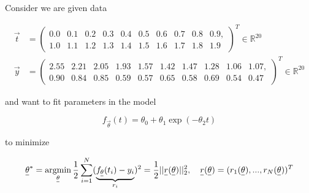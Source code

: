     Consider we are given data

    \begin{equation}
        \begin{aligned}
        \vec{t} &=
        \begin{pmatrix}
        0.0 & 0.1 & 0.2 & 0.3 & 0.4 & 0.5 & 0.6 & 0.7 & 0.8 & 0.9, \\
        1.0 & 1.1 & 1.2 & 1.3 & 1.4 & 1.5 & 1.6 & 1.7 & 1.8 & 1.9
        \end{pmatrix}^T \in \mathbb{R}^{20}\\
        \vec{y} &=
        \begin{pmatrix}
        2.55 & 2.21 & 2.05 & 1.93 & 1.57 & 1.42 & 1.47 & 1.28 & 1.06 & 1.07, \\
        0.90 & 0.84 & 0.85 & 0.59 & 0.57 & 0.65 & 0.58 & 0.69 & 0.54 & 0.47
        \end{pmatrix}^T \in \mathbb{R}^{20}
        \end{aligned}
    \end{equation}

    and want to fit parameters in the model

    \begin{equation}
        f_\vec{\theta}(t) = \theta_0 + \theta_1 \exp{\left(-\theta_2 t\right)}
    \end{equation}

    to minimize

    \begin{equation}
        \vec{\theta}^* = \argmin_{\vec{\theta}} \frac{1}{2} \sum_{i = 1}^{N} (\underbrace{f_\vec{\theta}(t_i) - y_i}_{r_i})^2 = \frac{1}{2} ||\vec{r}(\vec{\theta})||_2^2, \quad \vec{r}(\vec{\theta}) = (r_1(\vec{\theta}),...,r_N(\vec{\theta}))^T
    \end{equation}

